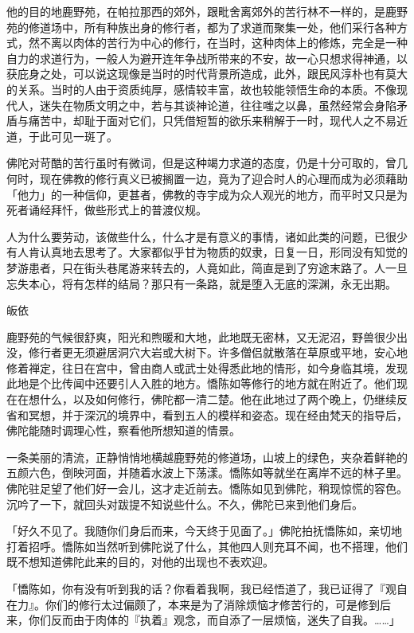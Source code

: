 \documentclass[12pt,twoside,openany]{book}
\begin{document}
他的目的地鹿野苑，在帕拉那西的郊外，跟毗舍离郊外的苦行林不一样的，是鹿野苑的修道场中，所有种族出身的修行者，都为了求道而聚集一处，他们采行各种方式，然不离以肉体的苦行为中心的修行，在当时，这种肉体上的修炼，完全是一种自力的求道行为，一般人为避开连年争战所带来的不安，故一心只想求得神通，以获庇身之处，可以说这现像是当时的时代背景所造成，此外，跟民风淳朴也有莫大的关系。当时的人由于资质纯厚，感情较丰富，故也较能领悟生命的本质。不像现代人，迷失在物质文明之中，若与其谈神论道，往往嗤之以鼻，虽然经常会身陷矛盾与痛苦中，却耻于面对它们，只凭借短暂的欲乐来稍解于一时，现代人之不易近道，于此可见一斑了。

佛陀对苛酷的苦行虽时有微词，但是这种竭力求道的态度，仍是十分可取的，曾几何时，现在佛教的修行真义已被搁置一边，竟为了迎合时人的心理而成为必须藉助「他力」的一种信仰，更甚者，佛教的寺宇成为众人观光的地方，而平时又只是为死者诵经拜忏，做些形式上的普渡仪规。

人为什么要劳动，该做些什么，什么才是有意义的事情，诸如此类的问题，已很少有人肯认真地去思考了。大家都似乎甘为物质的奴隶，日复一日，形同没有知觉的梦游患者，只在街头巷尾游来转去的，人竟如此，简直是到了穷途末路了。人一旦忘失本心，将有怎样的结局？那只有一条路，就是堕入无底的深渊，永无出期。

皈依

鹿野苑的气候很舒爽，阳光和煦暖和大地，此地既无密林，又无泥沼，野兽很少出没，修行者更无须避居洞穴大岩或大树下。许多僧侣就散落在草原或平地，安心地修着禅定，往日在宫中，曾由商人或武士处得悉此地的情形，如今身临其境，发现此地是个比传闻中还要引人入胜的地方。憍陈如等修行的地方就在附近了。他们现在在想什么，以及如何修行，佛陀都一清二楚。他在此地过了两个晚上，仍继续反省和冥想，并于深沉的境界中，看到五人的模样和姿态。现在经由梵天的指导后，佛陀能随时调理心性，察看他所想知道的情景。

一条美丽的清流，正静悄悄地横越鹿野苑的修道场，山坡上的绿色，夹杂着鲜艳的五颜六色，倒映河面，并随着水波上下荡漾。憍陈如等就坐在离岸不远的林子里。佛陀驻足望了他们好一会儿，这才走近前去。憍陈如见到佛陀，稍现惊慌的容色。沉吟了一下，就回头对跋提不知说些什么。不久，佛陀已来到他们身后。

「好久不见了。我随你们身后而来，今天终于见面了。」佛陀拍抚憍陈如，亲切地打着招呼。憍陈如当然听到佛陀说了什么，其他四人则充耳不闻，也不搭理，他们既不想知道佛陀此来的目的，对他的出现也不表欢迎。

「憍陈如，你有没有听到我的话？你看着我啊，我已经悟道了，我已证得了『观自在力』。你们的修行太过偏颇了，本来是为了消除烦恼才修苦行的，可是修到后来，你们反而由于肉体的『执着』观念，而自添了一层烦恼，迷失了自我。……」
\end{document}
